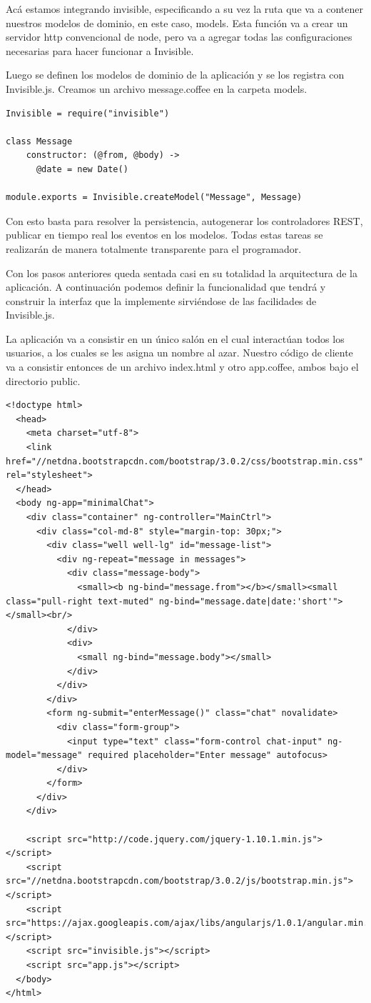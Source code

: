 \documentclass[doc,helv,longtable]{article}
\begin{document}
Acá estamos integrando invisible, especificando a su vez la ruta que va a contener nuestros modelos de dominio, en este caso, models. Esta función va a crear un servidor http convencional de node, pero va a agregar todas las configuraciones necesarias para hacer funcionar a Invisible.

Luego se definen los modelos de dominio de la aplicación y se los registra con Invisible.js. Creamos un archivo message.coffee en la carpeta models.

\begin{verbatim}
Invisible = require("invisible")

class Message
    constructor: (@from, @body) ->
      @date = new Date()

module.exports = Invisible.createModel("Message", Message)
\end{verbatim}

Con esto basta para resolver la persistencia, autogenerar los controladores REST, publicar en tiempo real los eventos en los modelos. Todas estas tareas se realizarán de manera totalmente transparente para el programador. 

Con los pasos anteriores queda sentada casi en su totalidad la arquitectura de la aplicación. A continuación podemos definir la funcionalidad que tendrá y construir la interfaz que la implemente sirviéndose de las facilidades de Invisible.js.

La aplicación va a consistir en un único salón en el cual interactúan todos los usuarios, a los cuales se les asigna un nombre al azar. Nuestro código de cliente va a consistir entonces de un archivo index.html y otro app.coffee, ambos bajo el directorio public.

\begin{verbatim}
<!doctype html>
  <head>
    <meta charset="utf-8">
    <link href="//netdna.bootstrapcdn.com/bootstrap/3.0.2/css/bootstrap.min.css" rel="stylesheet">
  </head>
  <body ng-app="minimalChat">
    <div class="container" ng-controller="MainCtrl">
      <div class="col-md-8" style="margin-top: 30px;">
        <div class="well well-lg" id="message-list"> 
          <div ng-repeat="message in messages">
            <div class="message-body">
              <small><b ng-bind="message.from"></b></small><small class="pull-right text-muted" ng-bind="message.date|date:'short'"></small><br/>
            </div>
            <div>
              <small ng-bind="message.body"></small>
            </div>
          </div>
        </div>
        <form ng-submit="enterMessage()" class="chat" novalidate>
          <div class="form-group">
            <input type="text" class="form-control chat-input" ng-model="message" required placeholder="Enter message" autofocus>
          </div>    
        </form>
      </div>
    </div>

    <script src="http://code.jquery.com/jquery-1.10.1.min.js"></script>
    <script src="//netdna.bootstrapcdn.com/bootstrap/3.0.2/js/bootstrap.min.js"></script>
    <script src="https://ajax.googleapis.com/ajax/libs/angularjs/1.0.1/angular.min.js"></script>
    <script src="invisible.js"></script>
    <script src="app.js"></script>
  </body>
</html>
\end{verbatim}
\end{document}
